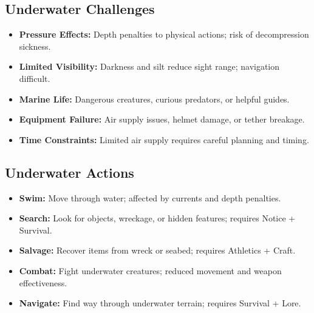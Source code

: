 \documentclass[11pt,oneside]{book}
\begin{document}
\begin{itemize}
\subsection*{Underwater Challenges}
\begin{itemize}
  \item \textbf{Pressure Effects:} Depth penalties to physical actions; risk of decompression sickness.
  \item \textbf{Limited Visibility:} Darkness and silt reduce sight range; navigation difficult.
  \item \textbf{Marine Life:} Dangerous creatures, curious predators, or helpful guides.
  \item \textbf{Equipment Failure:} Air supply issues, helmet damage, or tether breakage.
  \item \textbf{Time Constraints:} Limited air supply requires careful planning and timing.
\end{itemize}

\subsection*{Underwater Actions}
\begin{itemize}
  \item \textbf{Swim:} Move through water; affected by currents and depth penalties.
  \item \textbf{Search:} Look for objects, wreckage, or hidden features; requires Notice + Survival.
  \item \textbf{Salvage:} Recover items from wreck or seabed; requires Athletics + Craft.
  \item \textbf{Combat:} Fight underwater creatures; reduced movement and weapon effectiveness.
  \item \textbf{Navigate:} Find way through underwater terrain; requires Survival + Lore.
\end{itemize}


\end{itemize}
\end{document}

